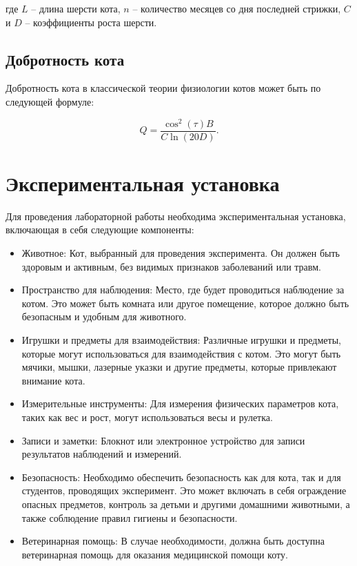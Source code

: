 \documentclass[12pt,a4paper]{article}
\begin{document}
где $L$ -- длина шерсти кота, $n$ -- количество месяцев со дня последней стрижки, $C$ и $D$ -- коэффициенты роста шерсти.

\subsection{Добротность кота}
Добротность кота в классической теории физиологии котов может быть по следующей формуле:

\begin{equation}\label{cat_quality}
Q = \frac{\cos^2(\tau)B}{C\ln(20D)}.
\end{equation}

\section{Экспериментальная установка}
Для проведения лабораторной работы необходима экспериментальная установка, включающая в себя следующие компоненты:
\begin{itemize}
    \item Животное: Кот, выбранный для проведения эксперимента. Он должен быть здоровым и активным, без видимых признаков заболеваний или травм.
    \item Пространство для наблюдения: Место, где будет проводиться наблюдение за котом. Это может быть комната или другое помещение, которое должно быть безопасным и удобным для животного.
    \item Игрушки и предметы для взаимодействия: Различные игрушки и предметы, которые могут использоваться для взаимодействия с котом. Это могут быть мячики, мышки, лазерные указки и другие предметы, которые привлекают внимание кота.
    \item Измерительные инструменты: Для измерения физических параметров кота, таких как вес и рост, могут использоваться весы и рулетка.
    \item Записи и заметки: Блокнот или электронное устройство для записи результатов наблюдений и измерений.
    \item Безопасность: Необходимо обеспечить безопасность как для кота, так и для студентов, проводящих эксперимент. Это может включать в себя ограждение опасных предметов, контроль за детьми и другими домашними животными, а также соблюдение правил гигиены и безопасности.
    \item Ветеринарная помощь: В случае необходимости, должна быть доступна ветеринарная помощь для оказания медицинской помощи коту.
\end{itemize}
\end{document}
